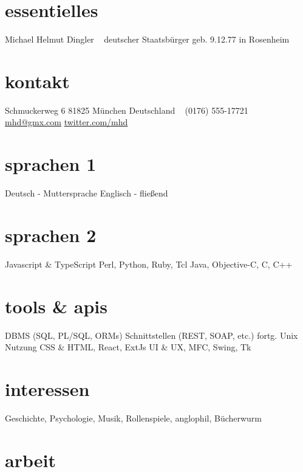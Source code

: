 \documentclass[]{friggeri-cv-a4}
\begin{document}


\begin{aside} %
\section{essentielles}
Michael Helmut Dingler
~
deutscher Staatsbürger
geb. 9.12.77 in Rosenheim
\section{kontakt}
Schmuckerweg 6
81825 München
Deutschland
~
(0176) 555-17721
~
\href{mailto:mhd@gmx.com}{mhd@gmx.com}
\href{http://twitter.com/mhd}{twitter.com/mhd}
\section{sprachen 1}
Deutsch - Muttersprache
Englisch - fließend
\section{sprachen 2}
Javascript \& TypeScript
Perl, Python, Ruby, Tcl
Java, Objective-C, C, C++
\section{tools \& apis}
DBMS (SQL, PL/SQL, ORMs)
Schnittstellen (REST, SOAP, etc.)
fortg. Unix Nutzung
CSS \& HTML, React, ExtJs
UI \& UX, MFC, Swing, Tk
\section{interessen}
Geschichte, Psychologie,
Musik, Rollenspiele,
anglophil, Bücherwurm
\end{aside}


\section{arbeit}

\end{document}
